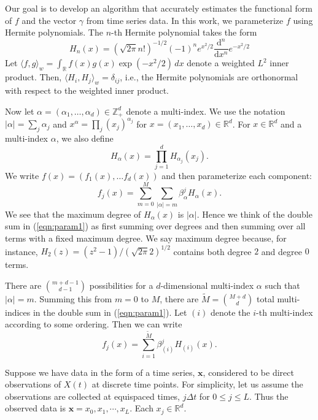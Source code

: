 \documentclass{article}
\begin{document}
Our goal is to develop an algorithm that accurately estimates the functional form of $f$ and the vector $\gamma$ from time series data.  In this work, we parameterize $f$ using Hermite polynomials.  The $n$-th Hermite polynomial takes the form
\begin{equation}
\label{eqn:hermdef}
H_n(x) = (\sqrt{2 \pi} n!)^{-1/2} (-1)^n e^{x^2/2} \dfrac{\mathrm{d}^n}{\mathrm{d}x^n} e^{-x^2/2}
\end{equation}
Let $\langle f, g \rangle_w = \int_{\mathbb{R}} f(x) g(x) \exp(-x^2/2) \, dx$ denote a weighted $L^2$ inner product.  Then, $\langle H_i, H_j \rangle_w = \delta_{ij}$, i.e., the Hermite polynomials are orthonormal with respect to the weighted inner product.

Now let $\alpha = (\alpha_1, \ldots, \alpha_d) \in \mathbb{Z}^d_+$ denote a multi-index.  We use the notation $|\alpha| = \sum_j \alpha_j$ and $x^\alpha = \prod_j (x_j)^{\alpha_j}$ for $x = (x_1, \ldots, x_d) \in \mathbb{R}^d$.  For $x \in \mathbb{R}^d$ and a multi-index $\alpha$, we also define
\begin{equation}
\label{eqn:hermmultiindex}
H_\alpha(x) = \prod_{j=1}^d H_{\alpha_j}(x_j).
\end{equation}
We write $f(x) = (f_1(x), \ldots f_d(x))$ and then parameterize each component:
\begin{equation}
\label{eqn:param1}
f_j(x) = \sum_{m=0}^M \sum_{|\alpha|=m} \beta^j_\alpha H_\alpha(x).
\end{equation}
We see that the maximum degree of $H_\alpha(x)$ is $|\alpha|$.  Hence we think of the double sum in (\ref{eqn:param1}) as first summing over degrees and then summing over all terms with a fixed maximum degree.  We say maximum degree because, for instance, $H_2(z) = (z^2-1)/(\sqrt{2 \pi} 2)^{1/2}$ contains both degree $2$ and degree $0$ terms.

There are $\binom{m + d - 1}{d-1}$ possibilities for a $d$-dimensional multi-index $\alpha$ such that $|\alpha| = m$.  Summing this from $m=0$ to $M$, there are $\widetilde{M} = \binom{M+d}{d}$ total multi-indices in the double sum in (\ref{eqn:param1}).  Let $(i)$ denote the $i$-th multi-index according to some ordering.  Then we can write
\begin{equation}
\label{eqn:param1}
f_j(x) = \sum_{i=1}^{\widetilde{M}} \beta^j_{(i)} H_{(i)}(x).
\end{equation}

Suppose we have data in the form of a time series, $\mathbf{x}$, considered to be direct observations of $X(t)$ at discrete time points.  For simplicity, let us assume the observations are collected at equispaced times, $j \Delta t$ for $0 \leq j \leq L$. Thus the observed data is $\mathbf{x} = x_0, x_1, \cdots, x_L$.  Each $x_j \in \mathbb{R}^d$.
\end{document}

